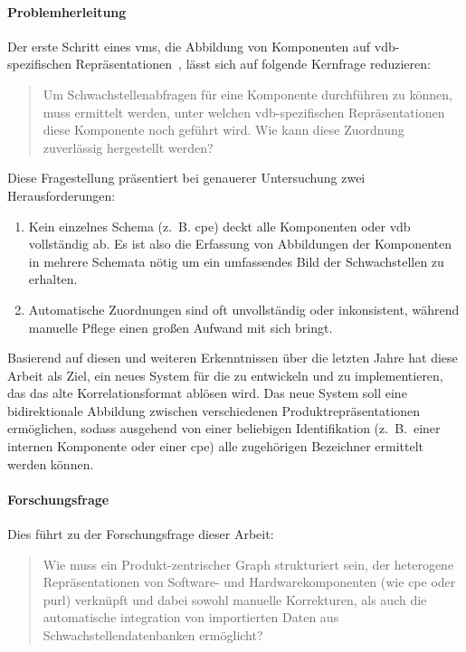 \paragraph{Problemherleitung}

Der erste Schritt eines \acrshort{vms}, die Abbildung von Komponenten auf \acrshort{vdb}-spezifischen Repräsentationen\ \autocite{Idrissi_Sebai_Faroukhi_Mahouachi_2024}, lässt sich auf folgende Kernfrage reduzieren:

\begin{quote}
    Um Schwachstellenabfragen für eine Komponente durchführen zu können, muss ermittelt werden, unter welchen \acrshort{vdb}-spezifischen Repräsentationen diese Komponente noch geführt wird.
    Wie kann diese Zuordnung zuverlässig hergestellt werden?
\end{quote}

Diese Fragestellung präsentiert bei genauerer Untersuchung zwei Herausforderungen:

\begin{enumerate}
    \item Kein einzelnes Schema (z.\ B. \acrshort{cpe}) deckt alle Komponenten oder \acrshort{vdb} vollständig ab.
    Es ist also die Erfassung von Abbildungen der Komponenten in mehrere Schemata nötig um ein umfassendes Bild der Schwachstellen zu erhalten.
    \item Automatische Zuordnungen sind oft unvollständig oder inkonsistent, während manuelle Pflege einen großen Aufwand mit sich bringt.
\end{enumerate}

Basierend auf diesen und weiteren Erkenntnissen über die letzten Jahre hat diese Arbeit als Ziel, ein neues System für die \metaeffektsp zu entwickeln und zu implementieren, das das alte Korrelationsformat ablösen wird.
Das neue System soll eine bidirektionale Abbildung zwischen verschiedenen Produktrepräsentationen ermöglichen, sodass ausgehend von einer beliebigen Identifikation (z.\ B.\ einer internen Komponente oder einer \acrshort{cpe}) alle zugehörigen Bezeichner ermittelt werden können.

\paragraph{Forschungsfrage}

Dies führt zu der Forschungsfrage dieser Arbeit:

\begin{quote}
    Wie muss ein Produkt-zentrischer Graph strukturiert sein, der heterogene Repräsentationen von Software- und Hardwarekomponenten (wie \acrfull{cpe} oder \acrfull{purl}) verknüpft und
    dabei sowohl manuelle Korrekturen, als auch die automatische integration von importierten Daten aus Schwachstellendatenbanken ermöglicht?
\end{quote}



